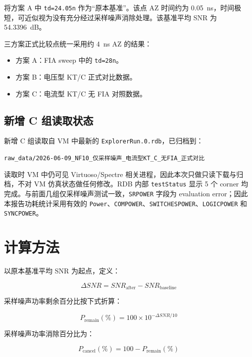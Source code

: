 \documentclass[12pt,a4paper]{ctexart}
\begin{document}
将方案 A 中 \texttt{td=24.05n} 作为“原本基准”。该点 AZ 时间约为 \SI{0.05}{ns}，时间极短，可近似视为没有充分经过采样噪声消除处理。该基准平均 SNR 为 \SI{54.3396}{dB}。

三方案正式比较点统一采用约 \SI{4}{ns} AZ 的结果：

\begin{itemize}
  \item 方案 A：FIA sweep 中的 \texttt{td=28n}。
  \item 方案 B：电压型 KT/C 正式对比数据。
  \item 方案 C：电流型 KT/C 无 FIA 对照数据。
\end{itemize}

\subsection{新增 C 组读取状态}

新增 C 组读取自 VM 中最新的 \texttt{ExplorerRun.0.rdb}，已归档到：

\begin{center}
\small
\texttt{raw\_data/2026-06-09\_NF10\_仅采样噪声\_电流型KT\_C\_无FIA\_正式对比}
\end{center}

读取时 VM 中仍可见 Virtuoso/Spectre 相关进程，因此本次只做只读下载与归档，不对 VM 仿真状态做任何修改。RDB 内部 \texttt{testStatus} 显示 5 个 corner 均完成。与前面几组仅采样噪声测试一致，\texttt{SRPOWER} 字段为 evaluation error；因此本报告功耗统计采用有效的 \texttt{Power}、\texttt{COMPOWER}、\texttt{SWITCHESPOWER}、\texttt{LOGICPOWER} 和 \texttt{SYNCPOWER}。

\section{计算方法}

以原本基准平均 SNR 为起点，定义：

\begin{equation}
\Delta SNR = SNR_{\text{after}} - SNR_{\text{baseline}}
\end{equation}

采样噪声功率剩余百分比按下式折算：

\begin{equation}
P_{\text{remain}}(\%) = 100 \times 10^{-\Delta SNR / 10}
\end{equation}

采样噪声功率消除百分比为：

\begin{equation}
P_{\text{cancel}}(\%) = 100 - P_{\text{remain}}(\%)
\end{equation}
\end{document}

